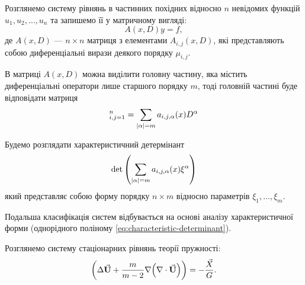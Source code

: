 Розглянемо систему рівнянь в частинних похідних відносно $n$ невідомих функцій $u_1, u_2, \ldots, u_n$ та запишемо її у матричному вигляді:
\begin{equation}
	A(x, D) y = f,
\end{equation}
де $A(x, D)$ --- $n \times n$ матриця з елементами $A_{i,j}(x,D)$, які представляють собою диференціальні вирази деякого порядку $\mu_{i,j}$. \medskip

В матриці $A(x,D)$ можна виділити головну частину, яка містить диференціальні оператори лише старшого порядку $m$, тоді головній частині буде відповідати матриця
\begin{equation}
	[A_0(x, D)]_{i,j=1}^n = \Sum_{|\alpha|=m} a_{i,j,\alpha} (x) D^\alpha
\end{equation}

Будемо розглядати характеристичний детермінант 
\begin{equation}
	\label{eq:characteristic-determinant}
	\det \left(\displaystyle\sum\limits_{|\alpha|=m} a_{i,j,\alpha} (x) \xi^\alpha \right)
\end{equation}
який представляє собою форму порядку $n \times m$ відносно параметрів $\xi_1, \ldots, \xi_m$. \medskip

Подальша класифікація систем відбувається на основі аналізу характеристичної форми (однорідного поліному \eqref{eq:characteristic-determinant}).

\begin{example}
	Розглянемо систему стаціонарних рівнянь теорії пружності:
	\begin{equation}
		\left( \Delta {\vec{\mathbf{U}}} + \frac{m}{m - 2} \nabla \Big(\nabla \cdot {\vec{\mathbf{U}}}\Big)\right) = - \frac{\vec X}{G}.
	\end{equation}
\end{example}

